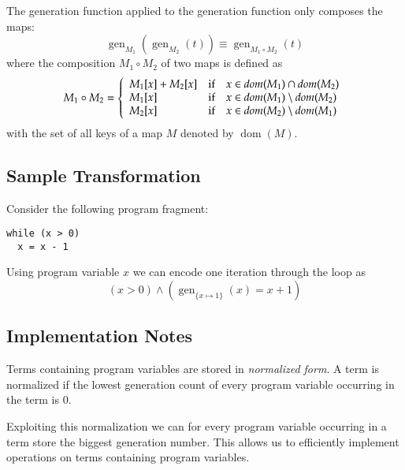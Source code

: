 \documentclass[a4paper,12pt]{article}
\newcommand\gen[1]{\mathop{gen}\nolimits_{#1}}
\newcommand\dom{\mathop{dom}}
\begin{document}
The generation function applied to the generation function only composes the maps:
\[
\gen{M_1}(\gen{M_2}(t))\equiv\gen{M_1\circ M_2}(t)
\]
where the composition $M_1\circ M_2$ of two maps is defined as
\[
M_1\circ M_2=\left\{\begin{array}{l@{\quad\text{if}\quad}l}
M_1[x] + M_2[x] & x\in\dom(M_1)\cap\dom(M_2)\\
M_1[x] & x\in\dom(M_1)\setminus\dom(M_2)\\
M_2[x] & x\in\dom(M_2)\setminus\dom(M_1)\\
\end{array}\right.
\]
with the set of all keys of a map $M$ denoted by $\dom(M)$.

\subsection{Sample Transformation}\label{sec:sampletrans}
Consider the following program fragment:
\begin{verbatim}
while (x > 0)
  x = x - 1
\end{verbatim}

Using program variable $x$ we can encode one iteration through the loop as
\[
(x > 0) \land (\gen{\{x\mapsto 1\}}(x) = x + 1)
\]

\subsection{Implementation Notes}\label{sec:implementationnotes}
Terms containing program variables are stored in \emph{normalized form}.
A term is normalized if the lowest generation count of every program variable occurring in the term is 0.

Exploiting this normalization we can for every program variable occurring in a term store the biggest generation number.
This allows us to efficiently implement operations on terms containing program variables.
\end{document}
